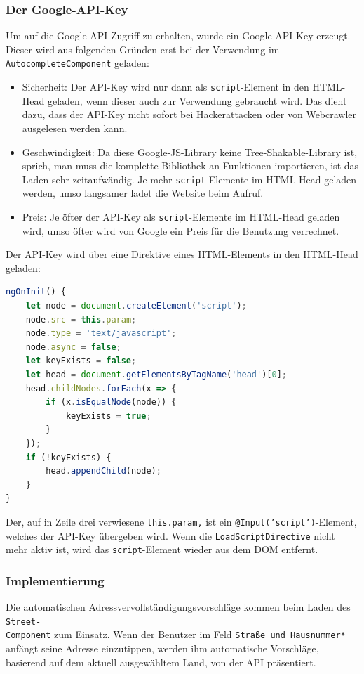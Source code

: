 \subsubsection{Der Google-API-Key}
Um auf die Google-API Zugriff zu erhalten, wurde ein Google-API-Key erzeugt. Dieser wird aus folgenden Gründen erst bei der Verwendung im \texttt{AutocompleteComponent} geladen:

\begin{itemize}
	
	\item Sicherheit: Der API-Key wird nur dann als \texttt{script}-Element in den HTML-Head geladen, wenn dieser auch zur Verwendung gebraucht wird. Das dient dazu, dass der API-Key nicht sofort bei Hackerattacken oder von Webcrawler ausgelesen werden kann.
	
	\item Geschwindigkeit: Da diese Google-JS-Library keine Tree-Shakable-Library ist, sprich, man muss die komplette Bibliothek an Funktionen importieren, ist das Laden sehr zeitaufwändig. Je mehr \texttt{script}-Elemente im HTML-Head geladen werden, umso langsamer ladet die Website beim Aufruf.
	
	\item Preis: Je öfter der API-Key als \texttt{script}-Elemente im HTML-Head geladen wird, umso öfter wird von Google ein Preis für die Benutzung verrechnet.
\end{itemize}

Der API-Key wird über eine Direktive eines HTML-Elements in den HTML-Head geladen:

\begin{lstlisting}[caption={Die \texttt{ngOnInit()}-Methode der \texttt{LoadScriptDirective}}, language=JavaScript,label={lst:gpac}]
ngOnInit() {
	let node = document.createElement('script');
	node.src = this.param;
	node.type = 'text/javascript';
	node.async = false;
	let keyExists = false;
	let head = document.getElementsByTagName('head')[0];
	head.childNodes.forEach(x => {
		if (x.isEqualNode(node)) {
			keyExists = true;
		}
	});
	if (!keyExists) {
		head.appendChild(node);
	}
}
\end{lstlisting}

Der, auf in Zeile drei verwiesene \texttt{this.param,} ist ein \texttt{@Input('script')}-Element, welches der API-Key übergeben wird. Wenn die \texttt{LoadScriptDirective} nicht mehr aktiv ist, wird das \texttt{script}-Element wieder aus dem DOM entfernt.

\subsubsection{Implementierung}
Die automatischen Adressvervollständigungsvorschläge kommen beim Laden des \texttt{Street-\\Component} zum Einsatz. Wenn der Benutzer im Feld \texttt{Straße und Hausnummer*} anfängt seine Adresse einzutippen, werden ihm automatische Vorschläge, basierend auf dem aktuell ausgewähltem Land, von der API präsentiert. 

